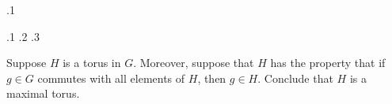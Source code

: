 \documentclass[minion]{homework}
\begin{document}
\begin{problems}

.1

.1
.2
.3

\problem  Suppose $H$ is a torus in $G$.  Moreover,
suppose that $H$ has the property that if $g\in G$
commutes with all elements of $H$, then $g\in H$.
Conclude that $H$ is a maximal torus.

\end{problems}
\end{document}
